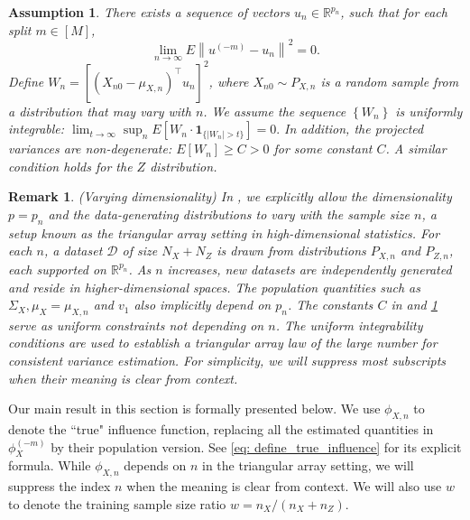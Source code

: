 \documentclass[11pt]{article}
\newtheorem{assumption}[theorem]{Assumption}
\newtheorem{remark}{Remark}[section]
\begin{document}
\begin{assumption}\label{assumption: degenerate}
There exists a sequence of vectors $u_n\in\mathbb{R}^{p_n}$, such that for each split $m\in[M]$, 
$$
\lim _{n \rightarrow \infty} E\left\|u^{(-m)}-u_n\right\|^2=0.
$$
Define $W_n=\left[\left(X_{n 0}-\mu_{X, n}\right)^{\top} u_n\right]^2$, where $X_{n 0} \sim P_{X, n}$ is a random sample from a distribution that may vary with $n$. We assume the sequence $\left\{W_n\right\}$ is uniformly integrable:
$
\lim _{t \rightarrow \infty} \sup _n E\left[W_n \cdot \mathbf{1}_{\{|W_n|>t\}}\right]=0.
$
In addition, the projected variances are non-degenerate: $E\left[W_n\right] \geq C>0$ for some constant $C$. A similar condition holds for the $Z$ distribution.
\end{assumption}

\begin{remark}\label{remark: triangular array}(Varying dimensionality) In , we explicitly allow the dimensionality $p=p_n$ and the data-generating distributions to vary with the sample size $n$, a setup known as the triangular array setting in high-dimensional statistics. For each $n$, a dataset $\mathcal{D}$ of size $N_X+N_Z$ is drawn from distributions $P_{X, n}$ and $P_{Z, n}$, each supported on $\mathbb{R}^{p_n}$. As $n$ increases, new datasets are independently generated and reside in higher-dimensional spaces. The population quantities such as $\Sigma_X, \mu_X = \mu_{X,n}$ and $v_1$ also implicitly depend on $p_n$. The constants $C$ in  and \ref{assumption: degenerate} serve as uniform constraints not depending on $n$. The uniform integrability conditions are used to establish a triangular array law of the large number for consistent variance estimation. For simplicity, we will suppress most subscripts when their meaning is clear from context.
\end{remark}

Our main result in this section is formally presented below. We use $\phi_{X,n}$ to denote the ``true" influence function, replacing all the estimated quantities in $\phi_X^{(-m)}$ by their population version. See \eqref{eq: define_true_influence} for its explicit formula. While $\phi_{X, n}$ depends on $n$ in the triangular array setting, we will suppress the index $n$ when the meaning is clear from context. We will also use $w$ to denote the training sample size ratio $w=n_X /\left(n_X+n_Z\right)$.
\end{document}

